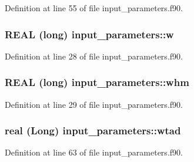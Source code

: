 Definition at line 55 of file input\_\-parameters.f90.

\hypertarget{namespaceinput__parameters_a745c6398e72faacdaacba0cf01027565}{
\subsubsection[{w}]{\setlength{\rightskip}{0pt plus 5cm}REAL (long) {\bf input\_\-parameters::w}}}
\label{namespaceinput__parameters_a745c6398e72faacdaacba0cf01027565}


Definition at line 28 of file input\_\-parameters.f90.

\hypertarget{namespaceinput__parameters_ae3a25357531dd0d2b8c5c4cc2de073d9}{
\subsubsection[{whm}]{\setlength{\rightskip}{0pt plus 5cm}REAL (long) {\bf input\_\-parameters::whm}}}
\label{namespaceinput__parameters_ae3a25357531dd0d2b8c5c4cc2de073d9}


Definition at line 29 of file input\_\-parameters.f90.

\hypertarget{namespaceinput__parameters_a8d452c8a3d45ee77279fc26867c74ed6}{
\subsubsection[{wtad}]{\setlength{\rightskip}{0pt plus 5cm}real (Long) {\bf input\_\-parameters::wtad}}}
\label{namespaceinput__parameters_a8d452c8a3d45ee77279fc26867c74ed6}


Definition at line 63 of file input\_\-parameters.f90.

